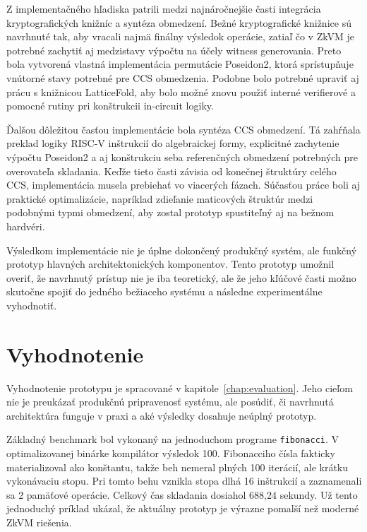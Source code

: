 Z implementačného hľadiska patrili medzi najnáročnejšie časti integrácia
kryptografických knižníc a syntéza obmedzení. Bežné kryptografické knižnice sú
navrhnuté tak, aby vracali najmä finálny výsledok operácie, zatiaľ čo v ZkVM je
potrebné zachytiť aj medzistavy výpočtu na účely witness generovania. Preto bola
vytvorená vlastná implementácia permutácie Poseidon2, ktorá sprístupňuje vnútorné
stavy potrebné pre CCS obmedzenia. Podobne bolo potrebné upraviť aj prácu s
knižnicou LatticeFold, aby bolo možné znovu použiť interné verifierové a pomocné
rutiny pri konštrukcii in-circuit logiky.

Ďalšou dôležitou časťou implementácie bola syntéza CCS obmedzení. Tá zahŕňala
preklad logiky RISC-V inštrukcií do algebraickej formy, explicitné zachytenie
výpočtu Poseidon2 a aj konštrukciu seba referenčných obmedzení potrebných pre
overovateľa skladania. Keďže tieto časti závisia od konečnej štruktúry celého CCS,
implementácia musela prebiehať vo viacerých fázach. Súčasťou práce boli aj
praktické optimalizácie, napríklad zdieľanie maticových štruktúr medzi podobnými
typmi obmedzení, aby zostal prototyp spustiteľný aj na bežnom hardvéri.

Výsledkom implementácie nie je úplne dokončený produkčný systém, ale funkčný
prototyp hlavných architektonických komponentov. Tento prototyp umožnil overiť,
že navrhnutý prístup nie je iba teoretický, ale že jeho kľúčové časti možno
skutočne spojiť do jedného bežiaceho systému a následne experimentálne
vyhodnotiť.

\section{Vyhodnotenie}

Vyhodnotenie prototypu je spracované v kapitole~\ref{chap:evaluation}. Jeho
cieľom nie je preukázať produkčnú pripravenosť systému, ale posúdiť, či
navrhnutá architektúra funguje v praxi a aké výsledky dosahuje neúplný
prototyp.

Základný benchmark bol vykonaný na jednoduchom programe \texttt{fibonacci}. V
optimalizovanej binárke kompilátor výsledok 100. Fibonacciho čísla fakticky
materializoval ako konštantu, takže beh nemeral plných 100 iterácií, ale krátku
vykonávaciu stopu. Pri tomto behu vznikla stopa dlhá 16 inštrukcií a zaznamenali
sa 2 pamäťové operácie. Celkový čas skladania dosiahol 688,24 sekundy. Už tento
jednoduchý príklad ukázal, že aktuálny prototyp je výrazne pomalší než moderné
ZkVM riešenia.

